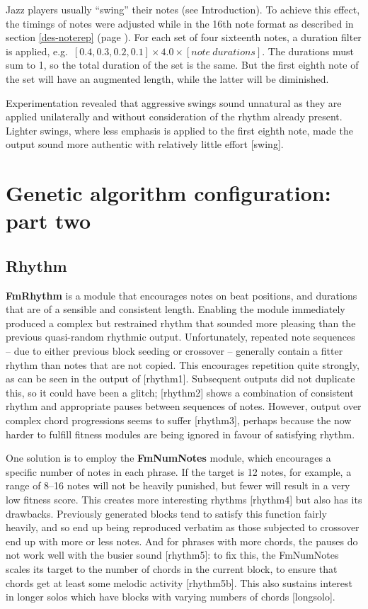 Jazz players usually ``swing'' their notes (see Introduction). To achieve this effect, the timings of notes were adjusted while in the 16th note format as described in section \ref{des-noterep} (page \pageref{des-noterep}). For each set of four sixteenth notes, a duration filter is applied, e.g.\ $[0.4, 0.3, 0.2, 0.1] \times 4.0 \times [note\ durations]$. The durations must sum to 1, so the total duration of the set is the same. But the first eighth note of the set will have an augmented length, while the latter will be diminished.

Experimentation revealed that aggressive swings sound unnatural as they are applied unilaterally and without consideration of the rhythm already present. Lighter swings, where less emphasis is applied to the first eighth note, made the output sound more authentic with relatively little effort [swing].

\section{Genetic algorithm configuration: part two}

\subsection{Rhythm}

\textbf{FmRhythm} is a module that encourages notes on beat positions, and durations that are of a sensible and consistent length. Enabling the module immediately produced a complex but restrained rhythm that sounded more pleasing than the previous quasi-random rhythmic output. Unfortunately, repeated note sequences -- due to either previous block seeding or crossover -- generally contain a fitter rhythm than notes that are not copied. This encourages repetition quite strongly, as can be seen in the output of [rhythm1]. Subsequent outputs did not duplicate this, so it could have been a glitch; [rhythm2] shows a combination of consistent rhythm and appropriate pauses between sequences of notes. However, output over complex chord progressions seems to suffer [rhythm3], perhaps because the now harder to fulfill fitness modules are being ignored in favour of satisfying rhythm.

One solution is to employ the \textbf{FmNumNotes} module, which encourages a specific number of notes in each phrase. If the target is 12 notes, for example, a range of 8--16 notes will not be heavily punished, but fewer will result in a very low fitness score. This creates more interesting rhythms [rhythm4] but also has its drawbacks. Previously generated blocks tend to satisfy this function fairly heavily, and so end up being reproduced verbatim as those subjected to crossover end up with more or less notes. And for phrases with more chords, the pauses do not work well with the busier sound [rhythm5]: to fix this, the FmNumNotes scales its target to the number of chords in the current block, to ensure that chords get at least some melodic activity [rhythm5b]. This also sustains interest in longer solos which have blocks with varying numbers of chords [longsolo].

